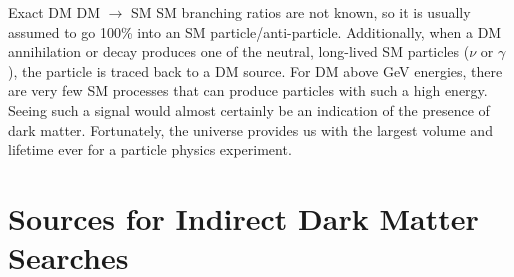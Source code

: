 Exact DM DM $\rightarrow$ SM SM branching ratios are not known, so it is usually assumed to go 100\% into an SM particle/anti-particle.
Additionally, when a DM annihilation or decay produces one of the neutral, long-lived SM particles ($\nu$ or $\gamma$), the particle is traced back to a DM source.
For DM above GeV energies, there are very few SM processes that can produce particles with such a high energy.
Seeing such a signal would almost certainly be an indication of the presence of dark matter.
Fortunately, the universe  provides us with the largest volume and lifetime ever for a particle physics experiment.

\section{Sources for Indirect Dark Matter Searches\label{sec:dm_targets}}

\begin{figure}
\end{figure}

